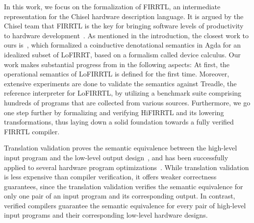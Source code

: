 In this work, we focus on the formalization of FIRRTL, an intermediate representation for the Chisel hardware description language.
It is argued by the Chisel team that FIRRTL is the key for bringing software levels of productivity to hardware
development~\cite{firrtl-spec}.
As mentioned in the introduction, the closest work to ours is~\cite{HarrisonHA21}, which formalized a coinductive denotational semantics in Agda for an idealized subset of LoFIRRT, based on a formalism called device calculus. Our work makes substantial progress from \cite{HarrisonHA21} in the following aspects:  At first, the operational semantics  of LoFIRRTL is defined for the first time. Moreover, extensive experiments are done to validate the semantics against Treadle, the reference interpreter for LoFIRRTL,  by utilizing a benchmark suite comprising hundreds of programs that are collected from various sources. Furthermore, we go one step further by formalizing and verifying HiFIRRTL and its lowering transformations, thus laying down a solid foundation towards a fully verified FIRRTL compiler. 

Translation validation proves the semantic equivalence between
the high-level input program and the low-level output design~\cite{PnueliSS98,Necula00},
and has been successfully applied
to several hardware program optimizations~\cite{KimKM04,KarfaMSPR06,BanerjeeKSM14,ChoukseyKB19,ChoukseyK20}.
While translation validation is less expensive than compiler verification, it offers weaker correctness guarantees, since the translation validation verifies the semantic equivalence for only one pair of an input program and its corresponding output.  %
In contrast, verified compilers guarantee the semantic equivalence for every pair of high-level input programs and their corresponding low-level hardware designs.






